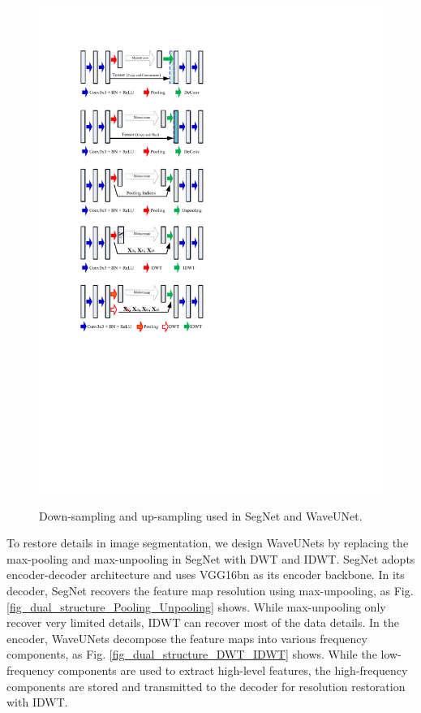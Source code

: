 \documentclass[10pt,twocolumn,letterpaper]{article}
\begin{document}
\begin{figure}[bpt]
{		\includegraphics*[scale=0.5, viewport=72 380 285 462]{figures/dual_structures.pdf}
	}\hspace{25pt}
	\caption{Down-sampling and up-sampling used in SegNet and WaveUNet.}\label{fig_dual_structures}
\end{figure}
To restore details in image segmentation, we design WaveUNets
by replacing the max-pooling and max-unpooling in SegNet \cite{badrinarayanan2017segnet} with DWT and IDWT.
SegNet adopts encoder-decoder architecture and uses VGG16bn as its encoder backbone.
In its decoder, SegNet recovers the feature map resolution using max-unpooling,
as Fig. \ref{fig_dual_structure_Pooling_Unpooling} shows.
While max-unpooling only recover very limited details,
IDWT can recover most of the data details.
In the encoder, WaveUNets decompose the feature maps into various frequency components,
as Fig. \ref{fig_dual_structure_DWT_IDWT} shows.
While the low-frequency components are used to extract high-level features,
the high-frequency components are stored and transmitted to the decoder for
resolution restoration with IDWT.
\end{document}
